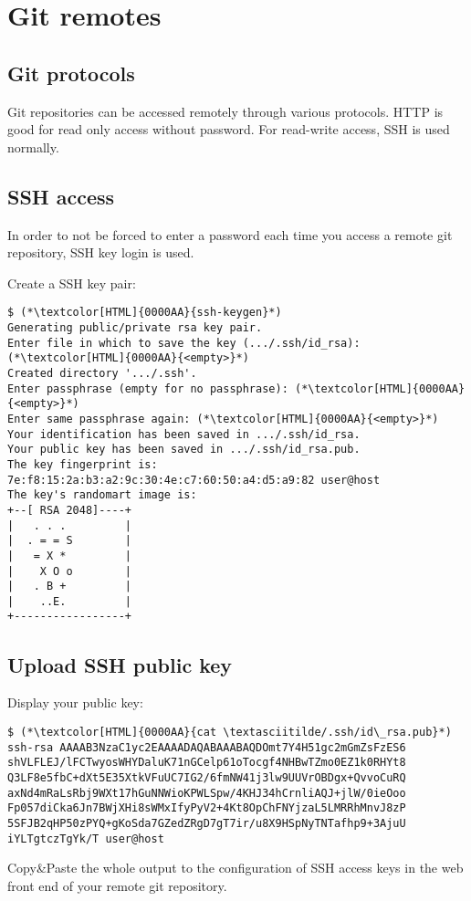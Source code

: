 \section{Git remotes}
\begin{frame}[fragile]
  \slidetitle
\end{frame}

\subsection{Git protocols}
\begin{frame}[fragile]
  \subslidetitle
  Git repositories can be accessed remotely through various protocols. HTTP is good for read only access without password.
  For read-write access, SSH is used normally.
\end{frame}

\subsection{SSH access}
\begin{frame}[fragile]
  \subslidetitle
  In order to not be forced to enter a password each time you access a remote
  git repository, SSH key login is used.

  Create a SSH key pair:
  \begin{lstlisting}
$ (*\textcolor[HTML]{0000AA}{ssh-keygen}*)
Generating public/private rsa key pair.
Enter file in which to save the key (.../.ssh/id_rsa): (*\textcolor[HTML]{0000AA}{<empty>}*)
Created directory '.../.ssh'.
Enter passphrase (empty for no passphrase): (*\textcolor[HTML]{0000AA}{<empty>}*)
Enter same passphrase again: (*\textcolor[HTML]{0000AA}{<empty>}*)
Your identification has been saved in .../.ssh/id_rsa.
Your public key has been saved in .../.ssh/id_rsa.pub.
The key fingerprint is:
7e:f8:15:2a:b3:a2:9c:30:4e:c7:60:50:a4:d5:a9:82 user@host
The key's randomart image is:
+--[ RSA 2048]----+
|   . . .         |
|  . = = S        |
|   = X *         |
|    X O o        |
|   . B +         |
|    ..E.         |
+-----------------+
\end{lstlisting}
\end{frame}

\subsection{Upload SSH public key}
\begin{frame}[fragile]
  \subslidetitle
  Display your public key:
  \begin{lstlisting}
$ (*\textcolor[HTML]{0000AA}{cat \textasciitilde/.ssh/id\_rsa.pub}*)
ssh-rsa AAAAB3NzaC1yc2EAAAADAQABAAABAQDOmt7Y4H51gc2mGmZsFzES6
shVLFLEJ/lFCTwyosWHYDaluK71nGCelp61oTocgf4NHBwTZmo0EZ1k0RHYt8
Q3LF8e5fbC+dXt5E35XtkVFuUC7IG2/6fmNW41j3lw9UUVrOBDgx+QvvoCuRQ
axNd4mRaLsRbj9WXt17hGuNNWioKPWLSpw/4KHJ34hCrnliAQJ+jlW/0ieOoo
Fp057diCka6Jn7BWjXHi8sWMxIfyPyV2+4Kt8OpChFNYjzaL5LMRRhMnvJ8zP
5SFJB2qHP50zPYQ+gKoSda7GZedZRgD7gT7ir/u8X9HSpNyTNTafhp9+3AjuU
iYLTgtczTgYk/T user@host
\end{lstlisting}
  Copy\&Paste the whole output to the configuration of SSH access keys
  in the web front end of your remote git repository.
\end{frame}

